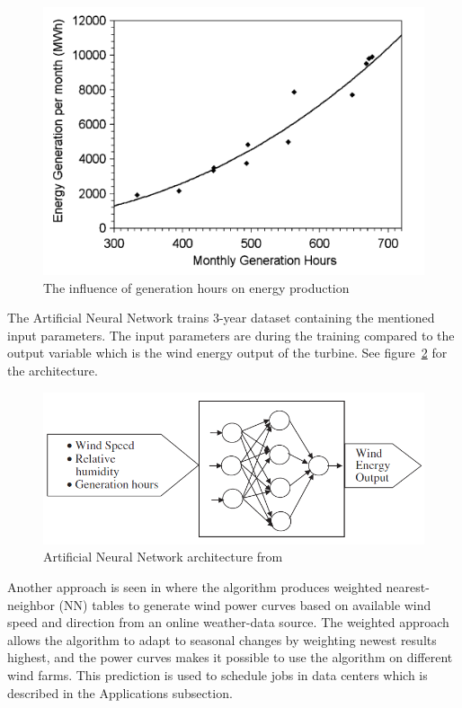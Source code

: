 \begin{figure}[h!]
\centering
\includegraphics[width=0.8\linewidth,natwidth=898,natheight=587]{billeder/GenerationHourVSGeneration.png}
\caption{The influence of generation hours on energy production \cite{WindPowerGenerationUsingANN}}
\label{fig:energyGenerationFromHours}
\end{figure} 

The Artificial Neural Network trains 3-year dataset containing the mentioned input parameters. The input parameters are during the training compared to the output variable which is the wind energy output of the turbine. See figure~\ref{fig:annArchitecture} for the architecture.
\\[0.5cm]
\begin{figure}[h!]
\centering
\includegraphics[width=0.7\linewidth,natwidth=898,natheight=587]{billeder/ANNwindSpeedPrediction.png}
\caption{Artificial Neural Network architecture from \cite{WindPowerGenerationUsingANN}}
\label{fig:annArchitecture}
\end{figure}

Another approach is seen in \cite{5} where the algorithm produces weighted nearest-neighbor (NN) tables to generate wind power curves based on available wind speed and direction from an online weather-data source. The weighted approach allows the algorithm to adapt to seasonal changes by weighting newest results highest, and the power curves makes it possible to use the algorithm on different wind farms. This prediction is used to schedule jobs in data centers which is described in the Applications subsection.

